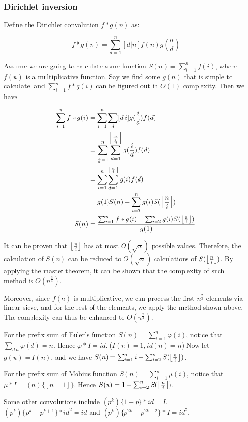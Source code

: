 \subsubsection{Dirichlet inversion}
Define the Dirichlet convolution $f*g(n)$ as:

$$f*g(n)=\sum^n_{d=1}[d|n]f(n)g(\frac{n}{d})$$

Assume we are going to calculate some function $S(n)=\sum^n_{i=1}f(i)$,
where $f(n)$ is a multiplicative function.
Say we find some $g(n)$ that is simple to calculate,
and $\sum^n_{i=1}f*g(i)$ can be figured out in $O(1)$ complexity.
Then we have

\begin{equation*}
\begin{split}
\sum^n_{i=1}f*g(i)	&=\sum^n_{i=1}\sum_d[d|i]g(\frac{i}{d})f(d)\\
					&=\sum^n_{\frac{i}{d}=1}\sum^{\floor*{\frac{n}{\frac{i}{d}}}}_{d=1}g(\frac{i}{d})f(d)\\
					&=\sum^n_{i=1}\sum^{\floor*{\frac{n}{i}}}_{d=1}g(i)f(d)\\
					&=g(1)S(n)+\sum^n_{i=2}g(i)S(\floor*{\frac{n}{i}})\\
S(n)				&=\frac{\sum^n_{i=1}f*g(i)-\sum^n_{i=2}g(i)S(\floor*{\frac{n}{i}})}{g(1)}\\
\end{split}
\end{equation*}

It can be proven that $\floor*{\frac{n}{i}}$ has at most $O(\sqrt{n})$ possible values.
Therefore, the calculation of $S(n)$ can be reduced to $O(\sqrt{n})$ calculations of $S(\floor*{\frac{n}{i}})$.
By applying the master theorem, it can be shown that the complexity of such method is $O(n^{\frac{3}{4}})$.

Moreover, since $f(n)$ is multiplicative, we can process the first $n^{\frac{2}{3}}$ elements via linear sieve,
and for the rest of the elements, we apply the method shown above. The complexity can thus be enhanced to $O(n^{\frac{2}{3}})$.

For the prefix sum of Euler's function $S(n)=\sum^n_{i=1}\varphi(i)$, notice that $\sum_{d|n}\varphi(d)=n$.
Hence $\varphi*I=id$. ($I(n)=1,id(n)=n$)
Now let $g(n)=I(n)$, and we have $S(n)=\sum^n_{i=1}i-\sum^n_{i=2}S(\floor*{\frac{n}{i}})$.

For the prefix sum of Mobius function $S(n)=\sum^n_{i=1}\mu(i)$, notice that $\mu*I=(n)\{[n=1]\}$.
Hence $S(n)=1-\sum^n_{i=2}S(\floor*{\frac{n}{i}})$.

Some other convolutions include $(p^k)\{1-p\}*id=I$, $(p^k)\{p^k-p^{k+1}\}*id^2=id$ and $(p^k)\{p^{2k}-p^{2k-2}\}*I=id^2$.

